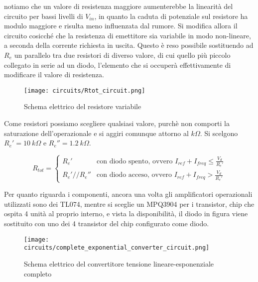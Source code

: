 notiamo che un valore di resistenza maggiore aumenterebbe la linearità del circuito per bassi
livelli di $V_{in}$, in quanto la caduta di potenziale sul resistore ha modulo maggiore e
risulta meno influenzata dal rumore. Si modifica allora il circuito cosicché che la
resistenza di emettitore sia variabile in modo non-lineare, a seconda della corrente
richiesta in uscita. Questo è reso possibile sostituendo ad $R_e$ un parallelo tra due resistori
di diverso valore, di cui quello più piccolo collegato in serie ad un diodo, l'elemento che
si occuperà effettivamente di modificare il valore di resistenza.

\begin{figure}[H]
    \centering
    \texttt{[image: circuits/Rtot\_circuit.png]}
    \caption{Schema elettrico del resistore variabile}
    \label{Rtot_circuit}
\end{figure}

Come resistori possiamo scegliere qualsiasi valore, purchè non comporti la saturazione
dell'operazionale e si aggiri comunque attorno al $k\Omega$. Si scelgono $R_e'=10\ k\Omega$
e $R_e''=1.2\ k\Omega$.

\begin{equation}\label{rtot}
    R_{tot} =
    \left\{
    \begin{array}{lr}
        R_e'        & \text{con diodo spento, ovvero } I_{ref}+I_{freq}\leq\frac{V_d}{R_e'} \\
        R_e'//R_e'' & \text{con diodo acceso, ovvero } I_{ref}+I_{freq}>\frac{V_d}{R_e'}
    \end{array}
    \right.
\end{equation}

Per quanto riguarda i componenti, ancora una volta gli amplificatori operazionali utilizzati
sono dei TL074, mentre si sceglie un MPQ3904 \cite{mpq3904} per i transistor, chip che
ospita 4 unità al proprio interno, e vista la disponibilità, il diodo in figura viene
sostituito con uno dei 4 transistor del chip configurato come diodo.

\begin{figure}[H]
    \centering
    \texttt{[image: circuits/complete\_exponential\_converter\_circuit.png]}
    \caption{Schema elettrico del convertitore tensione lineare-esponenziale completo}
    \label{complete_exponential_converter_circuit}
\end{figure}


